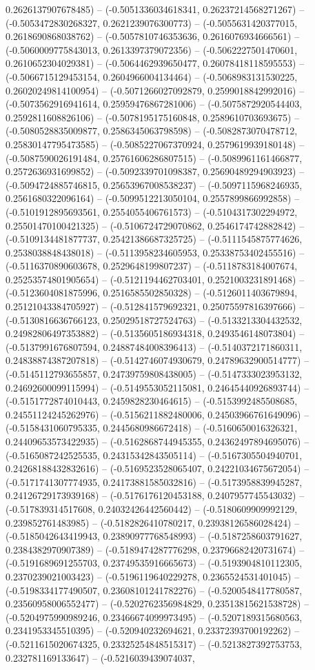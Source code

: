 0.2626137907678485) -- (-0.5051336034618341, 0.26237214568271267) -- (-0.5053472830268327, 0.2621239076300773) -- (-0.5055631420377015, 0.2618690868038762) -- (-0.5057810746353636, 0.2616076934666561) -- (-0.5060009775843013, 0.2613397379072356) -- (-0.5062227501470601, 0.2610652304029381) -- (-0.5064462939650477, 0.26078418118595553) -- (-0.5066715129453154, 0.2604966004134464) -- (-0.5068983131530225, 0.26020249814100954) -- (-0.5071266027092879, 0.2599018842992016) -- (-0.5073562916941614, 0.25959476867281006) -- (-0.5075872920544403, 0.2592811608826106) -- (-0.5078195175160848, 0.2589610703693675) -- (-0.5080528835009877, 0.2586345063798598) -- (-0.5082873070478712, 0.25830147795473585) -- (-0.5085227067370924, 0.2579619939180148) -- (-0.5087590026191484, 0.25761606286807515) -- (-0.5089961161466877, 0.2572636931699852) -- (-0.5092339701098387, 0.25690489294903923) -- (-0.5094724885746815, 0.25653967008538237) -- (-0.5097115968246935, 0.2561680322096164) -- (-0.5099512213050104, 0.2557899866992858) -- (-0.5101912895693561, 0.2554055406761573) -- (-0.5104317302294972, 0.25501470100421325) -- (-0.5106724729070862, 0.2546174742882842) -- (-0.5109134481877737, 0.25421386687325725) -- (-0.5111545875774626, 0.2538038848438018) -- (-0.5113958234605953, 0.25338753402455516) -- (-0.5116370890603678, 0.2529648199807237) -- (-0.5118783184007674, 0.25253574801905654) -- (-0.5121194462703401, 0.2521003231891468) -- (-0.5123604081875996, 0.2516585502850328) -- (-0.5126011403679894, 0.25121043384705927) -- (-0.512841579692321, 0.25075597816397666) -- (-0.5130816636766123, 0.25029518727524763) -- (-0.5133213304432532, 0.24982806497353882) -- (-0.5135605186934318, 0.2493546148073804) -- (-0.5137991676807594, 0.24887484008396413) -- (-0.5140372171860311, 0.24838874387207818) -- (-0.5142746074930679, 0.24789632900514777) -- (-0.5145112793655857, 0.24739759808438005) -- (-0.5147333023953132, 0.24692600099115994) -- (-0.5149553052115081, 0.24645440926893744) -- (-0.5151772874010443, 0.2459828230464615) -- (-0.5153992485508685, 0.24551124245262976) -- (-0.5156211882480006, 0.24503966761649096) -- (-0.5158431060795335, 0.2445680986672418) -- (-0.5160650016326321, 0.24409653573422935) -- (-0.5162868744945355, 0.24362497894695076) -- (-0.5165087242525535, 0.24315342843505114) -- (-0.5167305504940701, 0.24268188432832616) -- (-0.5169523528065407, 0.24221034675672054) -- (-0.5171741307774935, 0.24173881585032816) -- (-0.5173958839945287, 0.24126729173939168) -- (-0.5176176120453188, 0.2407957745543032) -- (-0.517839314517608, 0.24032426442560442) -- (-0.5180609909992129, 0.239852761483985) -- (-0.5182826410780217, 0.23938126586028424) -- (-0.5185042643419943, 0.23890977768548993) -- (-0.5187258603791627, 0.2384382970907389) -- (-0.5189474287776298, 0.23796682420731674) -- (-0.5191689691255703, 0.23749535916665673) -- (-0.5193904810112305, 0.2370239021003423) -- (-0.5196119640229278, 0.2365524531401045) -- (-0.5198334177490507, 0.23608101241782276) -- (-0.5200548417780587, 0.23560958006552477) -- (-0.5202762356984829, 0.23513815621538728) -- (-0.5204975990989246, 0.23466674099973495) -- (-0.5207189315680563, 0.2341953345510395) -- (-0.520940232694621, 0.23372393700192262) -- (-0.5211615020674325, 0.23325254848515317) -- (-0.5213827392753753, 0.232781169133647) -- (-0.5216039439074037, 